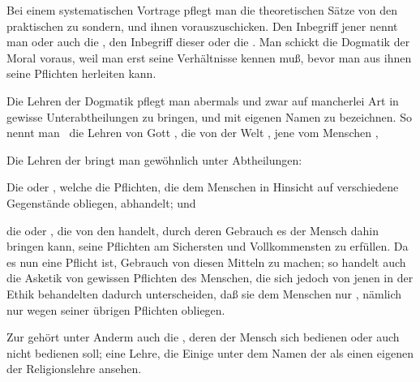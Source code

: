 \begin{aufza}
\begin{aufzb}
\begin{aufzc}
\end{aufzc}
\end{aufzb}
\item Bei einem systematischen Vortrage pflegt man die theoretischen Sätze von den praktischen zu sondern, und ihnen vorauszuschicken. Den Inbegriff jener nennt man  oder auch die , den Inbegriff dieser  oder die . Man schickt die Dogmatik der Moral voraus, weil man erst seine Verhältnisse kennen muß, bevor man aus ihnen seine Pflichten herleiten kann.
\item Die Lehren der Dogmatik pflegt man abermals und zwar auf mancherlei Art in gewisse Unterabtheilungen zu bringen, und mit eigenen Namen zu bezeichnen. So nennt man \zB\ die Lehren von Gott , die von der Welt , jene vom Menschen , \udgl~
\item Die Lehren der  bringt man gewöhnlich unter  Abtheilungen:
\begin{aufzb}
\item Die  oder , welche die Pflichten, die dem Menschen in Hinsicht auf verschiedene Gegenstände  obliegen, abhandelt; und
\item die  oder , die von den  handelt, durch deren Gebrauch es der Mensch dahin bringen kann, seine Pflichten am Sichersten und Vollkommensten zu erfüllen. Da es nun eine Pflicht ist, Gebrauch von diesen Mitteln zu machen; so handelt auch die Asketik von gewissen Pflichten des Menschen, die sich jedoch von jenen in der Ethik behandelten dadurch unterscheiden, daß sie dem Menschen nur , nämlich nur wegen seiner übrigen Pflichten obliegen.
\end{aufzb}
\end{aufza}
\begin{RWanm}
Zur  gehört unter Anderm auch die , deren der Mensch sich bedienen oder auch nicht bedienen soll; eine Lehre, die Einige unter dem Namen der  als einen eigenen  der Religionslehre ansehen.
\end{RWanm}

